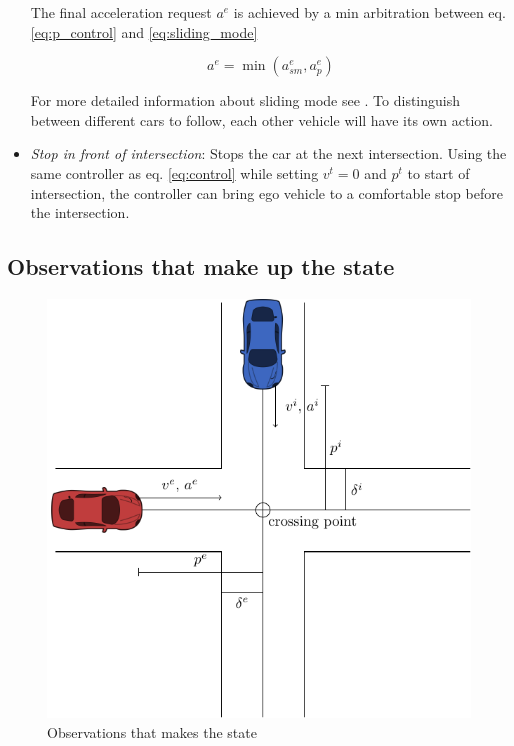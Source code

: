 \begin{itemize}
    The final acceleration request $a^e$ is achieved by a min arbitration between eq. \ref{eq:p_control} and \ref{eq:sliding_mode} 
    
    \begin{equation}
		a^e = \min(a^e_{sm}, a^e_p )
		\label{eq:control}
    \end{equation}

    For more detailed information about sliding mode see \cite{MemonAnalysisManoeuvers}. %
    To distinguish between different cars to follow, each other vehicle will have its own action. 
    
    \item \textit{Stop in front of intersection}: Stops the car at the next intersection. Using the same controller as eq. \ref{eq:control} while setting $v^t = 0$ and $p^t$ to start of intersection, the controller can bring ego vehicle to a comfortable stop before the intersection. 
	
\end{itemize}
\subsection{Observations that make up the state}
\label{sec:observations}
\begin{figure}[!h]
	\centering
	\includegraphics[width=0.6\columnwidth]{figures/figures-observations.pdf}
	\caption{Observations that makes the state}
	\label{fig:Observations}
\end{figure}

%

